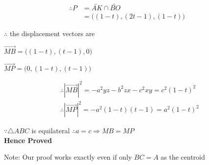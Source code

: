 \documentclass[a4paper,10pt]{article}
\begin{document}
\begin{equation}
\begin{split}
  \therefore P &=\overleftrightarrow{AK} \cap \overleftrightarrow{BO} \\
             & = \big((1-t),(2t-1),(1-t)\big)
\end{split}
\end{equation}


$\therefore $ the displacement vectors are 


\begin{center}
\begin{math}
 \overrightarrow{MB}=\big((1-t),(t-1),0\big)
\end{math}
\end{center}


\begin{center}
\begin{math}
 \overrightarrow{MP}=\big(0,(1-t),(t-1)\big)
\end{math}
\end{center}

\begin{center}
\begin{equation}
\begin{split}
&\therefore |\overrightarrow{MB}|^2 = -a^2yz - b^2zx -c^2xy = c^2(1-t)^2  \\
&\therefore |\overrightarrow{MP}|^2 = -a^2(1-t)(t-1)=a^2(1-t)^2 
\end{split}
\end{equation}
\end{center}

$\because \triangle ABC$ is equilateral $\therefore a=c \Rightarrow MB=MP $ \\

\textbf{Hence Proved}

Note: Our proof works exactly even if only  $BC=A$ as the centroid
 
\end{document}
